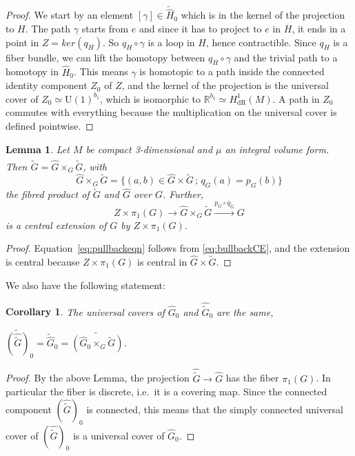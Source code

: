 \documentclass{article}
\newcommand{\dR}{\mathrm{dR}}
\newcommand{\R}{\mathbb{R}}
\newcommand{\U}{\mathrm{U}}
\newtheorem{Lemma}[Theorem]{Lemma}
\newtheorem{Corollary}[Theorem]{Corollary}
\theoremstyle{definition}
\begin{document}
\begin{proof}
We start by an element $[\gamma]\in \tilde{\hat H}_0$ which is in the kernel of the projection to $H$. The path $\gamma$ starts from $e$ and since it has to project to $e$ in $H$, it ends in a point in $Z=ker(q_H)$. So $q_H\circ\gamma$ is a loop in $H$, hence contractible. Since $q_H$ is a fiber bundle, we can lift the homotopy between $q_H\circ\gamma$ and the trivial path to a homotopy in $\hat H_0$. This means $\gamma$ is homotopic to a path inside the connected identity component $Z_0$ of $Z$, 
and the kernel of the projection is the universal cover of $Z_{0} \simeq \U(1)^{b_1}$, which is isomorphic to $\R^{b_1} \simeq H^1_{\dR}(M)$.
 A path in $Z_0$ commutes with everything because the multiplication on the universal cover is defined pointwise. 
\end{proof}


\begin{Lemma} Let $M$ be compact 3-dimensional and $\mu$ an integral volume form. Then $\widehat{\tilde G} = \hat G\times_G\tilde G$, with 
    \begin{equation}\label{eq:pullbackeqn}
    \widehat G\times_G\widetilde G=\{(a,b)\in \widehat G\times \widetilde G\,;\, q_G(a)=p_G(b)\}
    \end{equation}
    the fibred product of $\widetilde{G}$ and $\widehat{G}$ over $G$. Further,
     \begin{equation}
     Z\times \pi_1(G)\to \widehat G\times_G\widetilde G \overset{p_G\circ q_{\tilde G}}{\longrightarrow} G
     \end{equation}
    is a central extension of $G$ by $Z\times \pi_1(G)$.
    \end{Lemma}
\begin{proof} 
Equation~\ref{eq:pullbackeqn} follows from \eqref{eq:bullbackCE}, and the extension is central because 
$Z\times \pi_1(G)$ is central in $\widehat G\times \widetilde G$. 
\end{proof}
We also have the following statement:
\begin{Corollary}
The universal covers of $\widehat{G}_0$ and $\widehat{\tilde{G}}_0$ are the same,
 
    $\widetilde{(\hat{\tilde{G}})}_0={\tilde{\hat{G}}}_0 = \widetilde{(\hat{G}_0\times_G\tilde G)}$.
\end{Corollary}


\begin{proof}
By the above Lemma, the projection $\widehat{\tilde G}\to \hat G$ has the fiber $\pi_1(G)$. In particular the fiber is discrete, i.e.\ it is a covering map. Since 
the connected component $(\widehat{\tilde G})_0$ is connected, this means that the simply connected universal cover of $(\widehat{\tilde G})_0$ is a universal cover of $\hat G_0$.
\end{proof}
\end{document}
